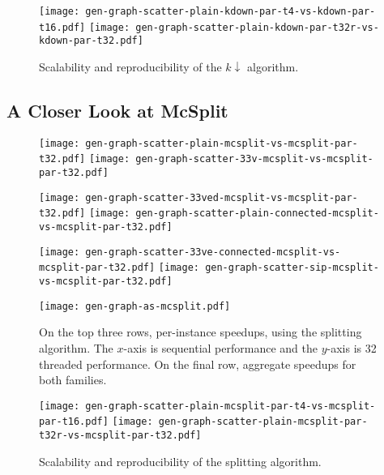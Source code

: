 \documentclass[sigconf]{acmart}
\begin{document}
\begin{figure}[tb]
    \texttt{[image: gen-graph-scatter-plain-kdown-par-t4-vs-kdown-par-t16.pdf]}
    \hfill
    \texttt{[image: gen-graph-scatter-plain-kdown-par-t32r-vs-kdown-par-t32.pdf]}

    \caption{Scalability and reproducibility of the $k{\downarrow}$ algorithm.}
\end{figure}

\subsection{A Closer Look at McSplit}

\begin{figure}[tb]
    \texttt{[image: gen-graph-scatter-plain-mcsplit-vs-mcsplit-par-t32.pdf]}
    \hfill
    \texttt{[image: gen-graph-scatter-33v-mcsplit-vs-mcsplit-par-t32.pdf]}

    \vspace*{1em}

    \texttt{[image: gen-graph-scatter-33ved-mcsplit-vs-mcsplit-par-t32.pdf]}
    \hfill
    \texttt{[image: gen-graph-scatter-plain-connected-mcsplit-vs-mcsplit-par-t32.pdf]}

    \vspace*{1em}

    \texttt{[image: gen-graph-scatter-33ve-connected-mcsplit-vs-mcsplit-par-t32.pdf]}
    \hfill
    \texttt{[image: gen-graph-scatter-sip-mcsplit-vs-mcsplit-par-t32.pdf]}

    \vspace*{1em}

    \texttt{[image: gen-graph-as-mcsplit.pdf]}

    \caption{On the top three rows, per-instance speedups, using the splitting algorithm. The
    $x$-axis is sequential performance and the $y$-axis is 32 threaded performance. On the final
    row, aggregate speedups for both families.}
\end{figure}

\begin{figure}[tb]
    \texttt{[image: gen-graph-scatter-plain-mcsplit-par-t4-vs-mcsplit-par-t16.pdf]}
    \hfill
    \texttt{[image: gen-graph-scatter-plain-mcsplit-par-t32r-vs-mcsplit-par-t32.pdf]}

    \caption{Scalability and reproducibility of the splitting algorithm.}
\end{figure}

%
%
%
%
\end{document}
